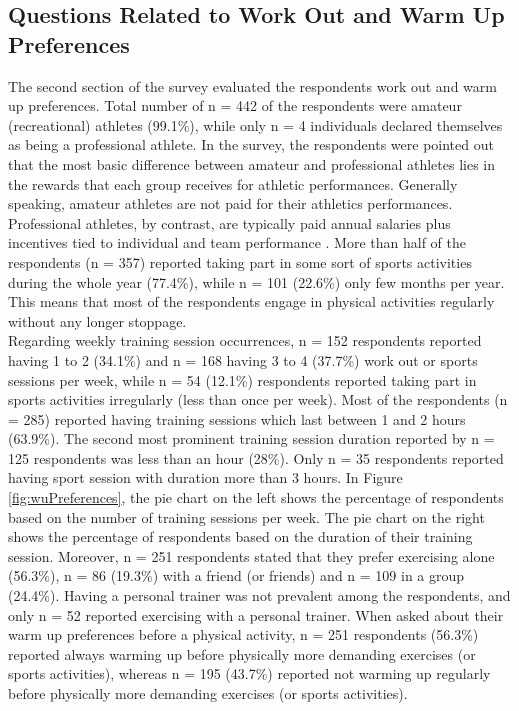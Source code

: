 \subsection{Questions Related to Work Out and Warm Up Preferences}
The second section of the survey evaluated the respondents work out and warm up preferences. Total number of n = 442 of the respondents were amateur (recreational) athletes (99.1\%), while only n = 4 individuals declared themselves as being a professional athlete. In the survey, the respondents were pointed out that the most basic difference between amateur and professional athletes lies in the rewards that each group receives for athletic performances. Generally speaking, amateur athletes are not paid for their athletics performances. Professional athletes, by contrast, are typically paid annual salaries plus incentives tied to individual and team performance \cite{amateurvsproffesional}. More than half of the respondents (n = 357) reported taking part in some sort of sports activities during the whole year (77.4\%), while n = 101 (22.6\%) only few months per year. This means that most of the respondents engage in physical activities regularly without any longer stoppage. \\Regarding weekly training session occurrences, n = 152 respondents reported having 1 to 2 (34.1\%) and n = 168 having 3 to 4 (37.7\%) work out or sports sessions per week, while n = 54 (12.1\%) respondents reported taking part in sports activities irregularly (less than once per week). Most of the respondents (n = 285) reported having training sessions which last between 1 and 2 hours (63.9\%). The second most prominent training session duration reported by n = 125 respondents was less than an hour (28\%). Only n = 35 respondents reported having sport session with duration more than 3 hours. In Figure \ref{fig:wuPreferences}, the pie chart on the left shows the percentage of respondents based on the number of training sessions per week. The pie chart on the right shows the percentage of respondents based on the duration of their training session. Moreover, n = 251 respondents stated that they prefer exercising alone (56.3\%), n = 86 (19.3\%) with a friend (or friends) and n = 109 in a group (24.4\%). Having a personal trainer was not prevalent among the respondents, and only n = 52 reported exercising with a personal trainer. When asked about their warm up preferences before a physical activity, n = 251 respondents (56.3\%) reported always warming up before physically more demanding exercises (or sports activities), whereas n = 195 (43.7\%) reported not warming up regularly before physically more demanding exercises (or sports activities).  \\
